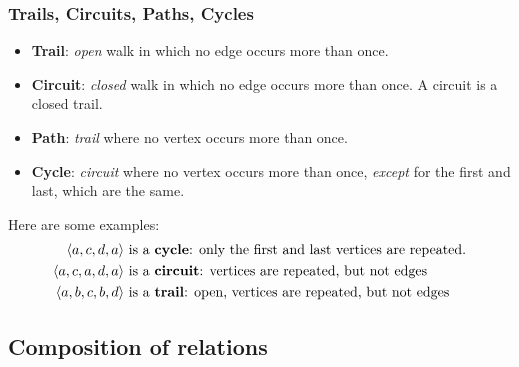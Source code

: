 \subsubsection*{Trails, Circuits, Paths, Cycles}
\begin{itemize}
  \item \textbf{Trail}: \textit{open} walk in which no edge occurs more than once.
  \item \textbf{Circuit}: \textit{closed} walk in which no edge occurs more than once. A circuit is a closed trail.
  \item \textbf{Path}: \textit{trail} where no vertex occurs more than once.
  \item \textbf{Cycle}: \textit{circuit} where no vertex occurs more than once, \textit{except} for the first and last, which are the same.
\end{itemize}
Here are some examples:
\begin{align*}
  \left\langle a,c,d,a\right\rangle   & \text{ is a \textbf{cycle}: only the first and last vertices are repeated.} \\
  \left\langle a,c,a,d,a\right\rangle & \text{ is a \textbf{circuit}: vertices are repeated, but not edges}         \\
  \left\langle a,b,c,b,d\right\rangle & \text{ is a \textbf{trail}: open, vertices are repeated, but not edges}
\end{align*}

\subsection{Composition of relations}

